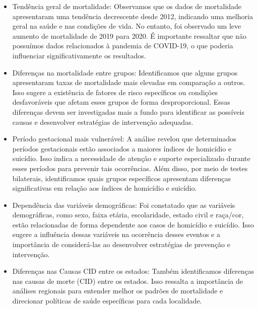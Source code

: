 \documentclass[
]{article}
\begin{document}
\begin{itemize}
\item
  Tendência geral de mortalidade: Observamos que os dados de mortalidade
  apresentaram uma tendência decrescente desde 2012, indicando uma
  melhoria geral na saúde e nas condições de vida. No entanto, foi
  observado um leve aumento de mortalidade de 2019 para 2020. É
  importante ressaltar que não possuímos dados relacionados à pandemia
  de COVID-19, o que poderia influenciar significativamente os
  resultados.
\item
  Diferenças na mortalidade entre grupos: Identificamos que alguns
  grupos apresentaram taxas de mortalidade mais elevadas em comparação a
  outros. Isso sugere a existência de fatores de risco específicos ou
  condições desfavoráveis que afetam esses grupos de forma
  desproporcional. Essas diferenças devem ser investigadas mais a fundo
  para identificar as possíveis causas e desenvolver estratégias de
  intervenção adequadas.
\item
  Período gestacional mais vulnerável: A análise revelou que
  determinados períodos gestacionais estão associados a maiores índices
  de homicídio e suicídio. Isso indica a necessidade de atenção e
  suporte especializado durante esses períodos para prevenir tais
  ocorrências. Além disso, por meio de testes bilaterais, identificamos
  quais grupos específicos apresentam diferenças significativas em
  relação aos índices de homicídio e suicídio.
\item
  Dependência das variáveis demográficas: Foi constatado que as
  variáveis demográficas, como sexo, faixa etária, escolaridade, estado
  civil e raça/cor, estão relacionadas de forma dependente aos casos de
  homicídio e suicídio. Isso sugere a influência dessas variáveis na
  ocorrência desses eventos e a importância de considerá-las ao
  desenvolver estratégias de prevenção e intervenção.
\item
  Diferenças nas Causas CID entre os estados: Também identificamos
  diferenças nas causas de morte (CID) entre os estados. Isso ressalta a
  importância de análises regionais para entender melhor os padrões de
  mortalidade e direcionar políticas de saúde específicas para cada
  localidade.
\end{itemize}
\end{document}
